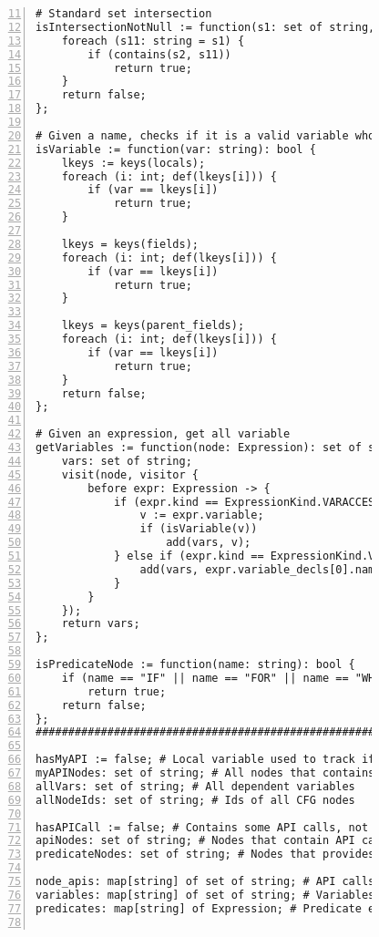 \begin{figure}[ht!]
\begin{lstlisting}[numbers=left, tabsize=4, escapechar=@, caption={API Usage Mining Analysis},label={lst:aun-code}, firstline = 11, firstnumber = 11, lastline = 60]
# Standard set intersection
isIntersectionNotNull := function(s1: set of string, s2: set of string): bool {
    foreach (s11: string = s1) {
        if (contains(s2, s11))
            return true;
    }
    return false;
};

# Given a name, checks if it is a valid variable whose type is available
isVariable := function(var: string): bool {
    lkeys := keys(locals);
    foreach (i: int; def(lkeys[i])) {
        if (var == lkeys[i])
            return true;
    }
    
    lkeys = keys(fields);
    foreach (i: int; def(lkeys[i])) {
        if (var == lkeys[i])
            return true;
    }
    
    lkeys = keys(parent_fields);
    foreach (i: int; def(lkeys[i])) {
        if (var == lkeys[i])
            return true;
    }
    return false;
};

# Given an expression, get all variable
getVariables := function(node: Expression): set of string {
    vars: set of string;
    visit(node, visitor {
        before expr: Expression -> {
            if (expr.kind == ExpressionKind.VARACCESS) {
                v := expr.variable;
                if (isVariable(v))
                    add(vars, v);
            } else if (expr.kind == ExpressionKind.VARDECL) {
                add(vars, expr.variable_decls[0].name);
            }
        }
    });
    return vars;
};

isPredicateNode := function(name: string): bool {
    if (name == "IF" || name == "FOR" || name == "WHILE")
        return true;
    return false;
};
#########################################################

hasMyAPI := false; # Local variable used to track if a node contains API method of interest
myAPINodes: set of string; # All nodes that contains API methods of interest
allVars: set of string; # All dependent variables
allNodeIds: set of string; # Ids of all CFG nodes

hasAPICall := false; # Contains some API calls, not necessarily API call of interest
apiNodes: set of string; # Nodes that contain API calls
predicateNodes: set of string; # Nodes that provides predicates

node_apis: map[string] of set of string; # API calls at nodes
variables: map[string] of set of string; # Variables at nodes
predicates: map[string] of Expression; # Predicate expressions at nodes


\end{lstlisting}
\end{figure}
